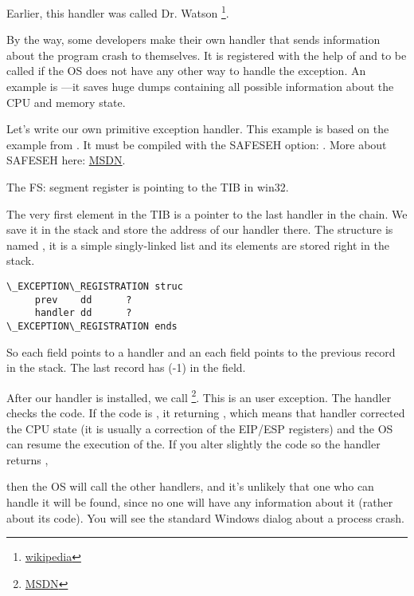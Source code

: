 Earlier, this handler was called Dr. Watson
\footnote{\href{http://go.yurichev.com/17046}{wikipedia}}.

By the way, some developers make their own handler that sends information about the program crash to themselves.
It is registered with the help of  
and to be called if the \ac{OS} does not have any other way to handle the exception.
\myindex{\oracle}
An example is \oracle---it saves huge dumps containing all possible information about the \ac{CPU} and memory state.

Let's write our own primitive exception handler.
This example is based on the example from \PietrekSEH.
It must be compiled with the SAFESEH option: .
More about SAFESEH here: \href{http://go.yurichev.com/17252}{MSDN}.



The FS: segment register is pointing to the \ac{TIB} in win32.

The very first element in the \ac{TIB} is a pointer to the last handler in the chain.
We save it in the stack and store the address of our handler there.
The structure is named , it is a simple singly-linked list and its elements are stored right in the stack.

\begin{lstlisting}[caption=MSVC/VC/crt/src/exsup.inc]
\_EXCEPTION\_REGISTRATION struc
     prev    dd      ?
     handler dd      ?
\_EXCEPTION\_REGISTRATION ends
\end{lstlisting}

So each  field points to a handler and an each  field points to the previous record in the stack.
The last record has  (-1) in the  field.



After our handler is installed, we call 
\footnote{\href{http://go.yurichev.com/17253}{MSDN}}.
This is an user exception. 
The handler checks the code.
If the code is , it returning ,
which means that handler corrected the CPU state (it is usually a correction of the EIP/ESP registers) and the \ac{OS} can resume the execution of the.
If you alter slightly the code so the handler returns ,

then the \ac{OS} will call the other handlers, and it's unlikely that one who can handle it will be found, since
no one will have any information about it (rather about its code).
You will see the standard Windows dialog about a process crash.


